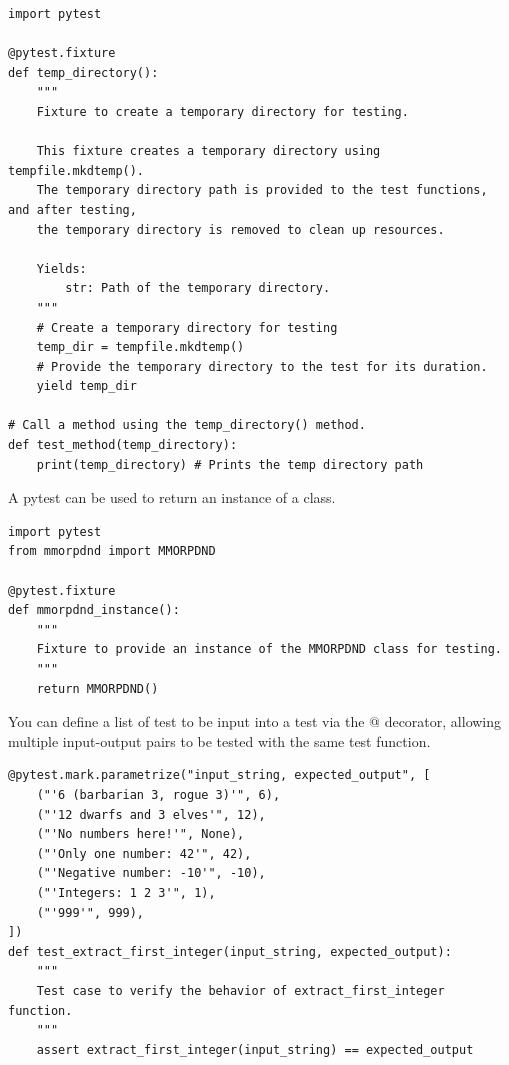 \begin{lstlisting}
import pytest

@pytest.fixture
def temp_directory():
    """
    Fixture to create a temporary directory for testing.

    This fixture creates a temporary directory using tempfile.mkdtemp().
    The temporary directory path is provided to the test functions, and after testing,
    the temporary directory is removed to clean up resources.

    Yields:
        str: Path of the temporary directory.
    """
    # Create a temporary directory for testing
    temp_dir = tempfile.mkdtemp()
    # Provide the temporary directory to the test for its duration.
    yield temp_dir

# Call a method using the temp_directory() method.
def test_method(temp_directory):
	print(temp_directory) # Prints the temp directory path
\end{lstlisting}

A pytest  can be used to return an instance of a class.

\begin{lstlisting}
import pytest
from mmorpdnd import MMORPDND

@pytest.fixture
def mmorpdnd_instance():
    """
    Fixture to provide an instance of the MMORPDND class for testing.
    """
    return MMORPDND()
\end{lstlisting}

You can define a list of test  to be input into a test via the @ decorator, allowing multiple input-output pairs to be tested with the same test function.

\begin{lstlisting}
@pytest.mark.parametrize("input_string, expected_output", [
    ("'6 (barbarian 3, rogue 3)'", 6),
    ("'12 dwarfs and 3 elves'", 12),
    ("'No numbers here!'", None),
    ("'Only one number: 42'", 42),
    ("'Negative number: -10'", -10),
    ("'Integers: 1 2 3'", 1),
    ("'999'", 999),
])
def test_extract_first_integer(input_string, expected_output):
    """
    Test case to verify the behavior of extract_first_integer function.
    """
    assert extract_first_integer(input_string) == expected_output
\end{lstlisting}










